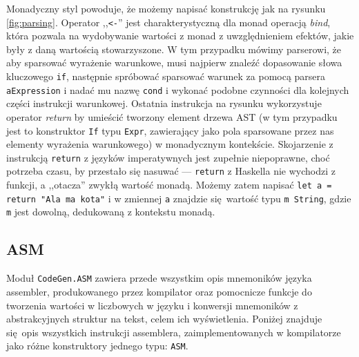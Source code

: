 Monadyczny styl powoduje, że możemy napisać konstrukcję jak na rysunku \ref{fig:parsing}. Operator ,,\texttt{<-}'' jest charakterystyczną dla monad operacją \textit{bind}, która pozwala na wydobywanie wartości z monad z uwzględnieniem efektów, jakie były z daną wartością stowarzyszone. W tym przypadku mówimy parserowi, że aby sparsować wyrażenie warunkowe, musi najpierw znaleźć dopasowanie słowa kluczowego \texttt{if}, następnie spróbować sparsować warunek za pomocą parsera \texttt{aExpression} i nadać mu nazwę \texttt{cond} i wykonać podobne czynności dla kolejnych części instrukcji warunkowej. Ostatnia instrukcja na rysunku wykorzystuje operator \textit{return} by umieścić tworzony element drzewa AST (w tym przypadku jest to konstruktor \texttt{If} typu \texttt{Expr}, zawierający jako pola sparsowane przez nas elementy wyrażenia warunkowego) w monadycznym kontekście. Skojarzenie z instrukcją \texttt{return} z języków imperatywnych jest zupełnie niepoprawne, choć potrzeba czasu, by przestało się nasuwać --- \texttt{return} z Haskella nie wychodzi z funkcji, a ,,otacza'' zwykłą wartość monadą. Możemy zatem napisać \texttt{let a = return "Ala ma kota"} i w zmiennej \texttt{a} znajdzie się wartość typu \texttt{m String}, gdzie \texttt{m} jest dowolną, dedukowaną z kontekstu monadą.


\subsection{ASM}

Moduł \texttt{CodeGen.ASM} zawiera przede wszystkim opis mnemoników języka assembler, produkowanego przez kompilator oraz pomocnicze funkcje do tworzenia wartości w liczbowych w języku i konwersji mnemoników z abstrakcyjnych struktur na tekst, celem ich wyświetlenia. Poniżej znajduje się opis wszystkich instrukcji assemblera, zaimplementowanych w kompilatorze jako różne konstruktory jednego typu: \texttt{ASM}.

